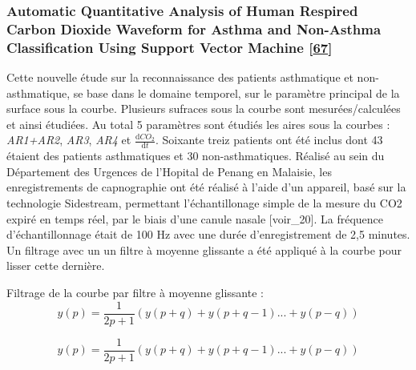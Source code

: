 \documentclass[12pt,]{article}
\begin{document}
\hypertarget{automatic-quantitative-analysis-of-human-respired-carbon-dioxide-waveform-for-asthma-and-non-asthma-classification-using-support-vector-machine-singh2018automatic}{%
\subsubsection{\texorpdfstring{Automatic Quantitative Analysis of Human
Respired Carbon Dioxide Waveform for Asthma and Non-Asthma
Classification Using Support Vector Machine
{[}\protect\hyperlink{ref-singh2018automatic}{67}{]}}{Automatic Quantitative Analysis of Human Respired Carbon Dioxide Waveform for Asthma and Non-Asthma Classification Using Support Vector Machine {[}67{]}}}\label{automatic-quantitative-analysis-of-human-respired-carbon-dioxide-waveform-for-asthma-and-non-asthma-classification-using-support-vector-machine-singh2018automatic}}

Cette nouvelle étude sur la reconnaissance des patients asthmatique et
non-asthmatique, se base dans le domaine temporel, sur le paramètre
principal de la surface sous la courbe. Plusieurs sufraces sous la
courbe sont mesurées/calculées et ainsi étudiées. Au total 5 paramètres
sont étudiés les aires sous la courbes : \emph{AR1+AR2}, \emph{AR3},
\emph{AR4} et \(\frac{\mathrm{d}CO_{2}}{\mathrm{d}t}\). Soixante treiz
patients ont été inclus dont 43 étaient des patients asthmatiques et 30
non-asthmatiques. Réalisé au sein du Département des Urgences de
l'Hopital de Penang en Malaisie, les enregistrements de capnographie ont
été réalisé à l'aide d'un appareil, basé sur la technologie Sidestream,
permettant l'échantillonage simple de la mesure du CO2 expiré en temps
réel, par le biais d'une canule nasale {[}voir\_20{]}. La fréquence
d'échantillonnage était de 100 Hz avec une durée d'enregistrement de 2,5
minutes. Un filtrage avec un un filtre à moyenne glissante a été
appliqué à la courbe pour lisser cette dernière.

Filtrage de la courbe par filtre à moyenne glissante :
\[y(p)=\frac{1}{2p+1}(y(p+q)+y(p+q-1)...+y(p-q))\]

\begin{equation}
  y(p)=\frac{1}{2p+1}(y(p+q)+y(p+q-1)...+y(p-q))
\label{eq:moyenne glissante}
\end{equation}
\end{document}
